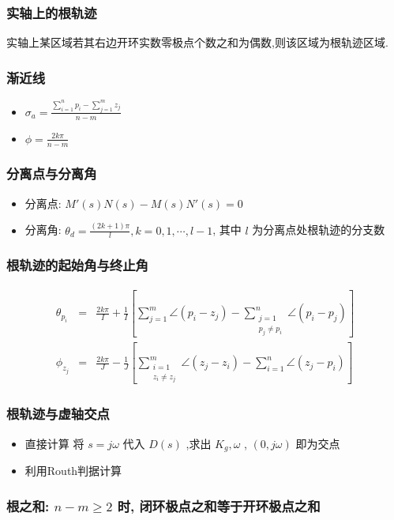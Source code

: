\documentclass{article}
\begin{document}
\begin{frame}
\frametitle{实轴上的根轨迹}
\label{sec-3-2-4}

     实轴上某区域若其右边开环实数零极点个数之和为偶数,则该区域为根轨迹区域.
\end{frame}
\begin{frame}
\frametitle{渐近线}
\label{sec-3-2-5}

\begin{itemize}
\item $\sigma_a =\frac{\sum_{i=1}^n p_i -\sum_{j=1}^m z_j}{n-m}$
\item $\phi = \frac{2k\pi}{n-m}$
\end{itemize}
\end{frame}
\begin{frame}
\frametitle{分离点与分离角}
\label{sec-3-2-6}

\begin{itemize}
\item 分离点: $M'(s)N(s)-M(s)N'(s)=0$
\item 分离角: $\theta_d=\frac{(2k+1)\pi}{l}, k=0,1,\cdots,l-1$, 其中 $l$ 为分离点处根轨迹的分支数
\end{itemize}
\end{frame}
\begin{frame}
\frametitle{根轨迹的起始角与终止角}
\label{sec-3-2-7}

      \begin{eqnarray*}
      \theta_{p_i} & = & \frac{2k\pi}{I}+\frac{1}{I}\left[\sum_{j=1}^m\angle(p_i-z_j)-\sum_{\substack{j=1 \\ p_j\neq p_i}}^n\angle(p_i-p_j)\right] \\
      \phi_{z_j} & = & \frac{2k\pi}{J}-\frac{1}{J}\left[\sum_{\substack{i=1 \\ z_i\neq z_j}}^m\angle(z_j-z_i)-\sum_{i=1}^n\angle(z_j-p_i)\right] 
      \end{eqnarray*}
\end{frame}
\begin{frame}
\frametitle{根轨迹与虚轴交点}
\label{sec-3-2-8}

\begin{itemize}
\item 直接计算 将 $s=j\omega$ 代入 $D(s)$ ,求出 $K_g,\omega$ , $(0,j\omega)$ 即为交点
\item 利用Routh判据计算
\end{itemize}
\end{frame}
\begin{frame}
\frametitle{根之和: $n-m\geq 2$ 时, 闭环极点之和等于开环极点之和}
\label{sec-3-2-9}
\end{frame}
\end{document}
